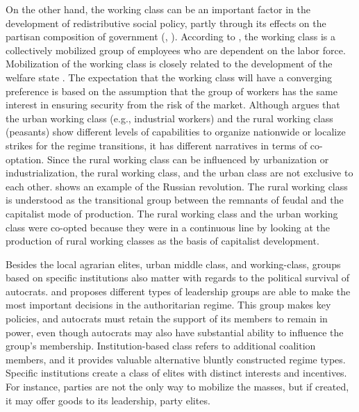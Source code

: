\documentclass[11pt]{article}
\begin{document}
On the other hand, the working class can be an important factor in the development of redistributive social policy, partly through its effects on the partisan composition of government (\citealp{HuberStephens2001}, \citealp[794]{Rasmussen2018}). According to \citet[175]{Korpi2006}, the working class is a collectively mobilized group of employees who are dependent on the labor force. Mobilization of the working class is closely related to the development of the welfare state \citep{Shalev1983}. The expectation that the working class will have a converging preference is based on the assumption that the group of workers has the same interest in ensuring security from the risk of the market. Although \citet[1495]{Dahlum2019} argues that the urban working class (e.g., industrial workers) and the rural working class (peasants) show different levels of capabilities to organize nationwide or localize strikes for the regime transitions, it has different narratives in terms of co-optation. Since the rural working class can be influenced by urbanization or industrialization, the rural working class, and the urban class are not exclusive to each other. \citet[1932]{Chandra2002} shows an example of the Russian revolution. The rural working class is understood as the transitional group between the remnants of feudal and the capitalist mode of production. The rural working class and the urban working class were co-opted because they were in a continuous line by looking at the production of rural working classes as the basis of capitalist development. 

Besides the local agrarian elites, urban middle class, and working-class, groups based on specific institutions also matter with regards to the political survival of autocrats. \citet{Geddes1999} and \citet{Geddes2014} proposes different types of leadership groups are able to make the most important decisions in the authoritarian regime. This group makes key policies, and autocrats must retain the support of its members to remain in power, even though autocrats may also have substantial ability to influence the group's membership. Institution-based class refers to additional coalition members, and it provides valuable alternative bluntly constructed regime types. Specific institutions create a class of elites with distinct interests and incentives. For instance, parties are not the only way to mobilize the masses, but if created, it may offer goods to its leadership, party elites. 
\end{document}
